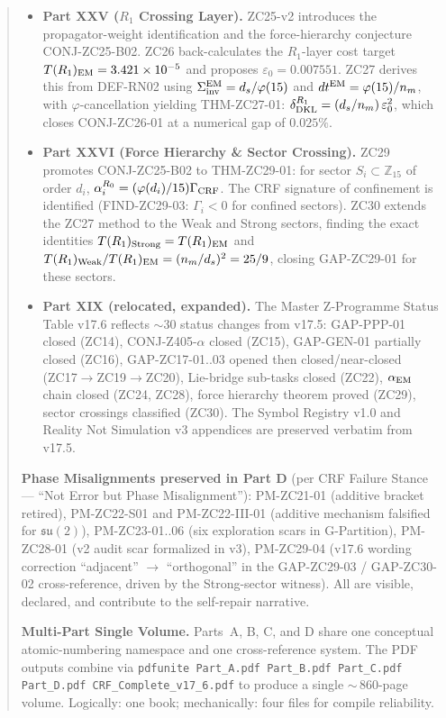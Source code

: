 \documentclass[12pt, a4paper]{article}
\begin{document}
\begin{abstract}
\begin{itemize}[leftmargin=2em]
\item \textbf{Part XXV ($R_1$ Crossing Layer).} ZC25-v2 introduces
the propagator-weight identification and the force-hierarchy
conjecture CONJ-ZC25-B02. ZC26 back-calculates the $R_1$-layer cost
target $T(R_1)_{\rm EM} = 3.421\times 10^{-5}$ and proposes
$\varepsilon_0 = 0.007551$. ZC27 derives this from DEF-RN02 using
$\Sigma_{\rm inv}^{\rm EM} = d_s/\varphi(15)$ and $dt^{\rm EM}
= \varphi(15)/n_m$, with $\varphi$-cancellation yielding
THM-ZC27-01: $\delta_{\rm DKL}^{R_1} = (d_s/n_m)\,\varepsilon_0^2$,
which closes CONJ-ZC26-01 at a numerical gap of $0.025\%$.

\item \textbf{Part XXVI (Force Hierarchy \& Sector Crossing).}
ZC29 promotes CONJ-ZC25-B02 to THM-ZC29-01: for sector $S_i \subset
\mathbb{Z}_{15}$ of order $d_i$, $\alpha_i^{R_0} = (\varphi(d_i)/15)
\Gamma_{\rm CRF}$. The CRF signature of confinement is identified
(FIND-ZC29-03: $\Gamma_i < 0$ for confined sectors). ZC30 extends
the ZC27 method to the Weak and Strong sectors, finding the exact
identities $T(R_1)_{\rm Strong} = T(R_1)_{\rm EM}$ and
$T(R_1)_{\rm Weak}/T(R_1)_{\rm EM} = (n_m/d_s)^2 = 25/9$, closing
GAP-ZC29-01 for these sectors.

\item \textbf{Part XIX (relocated, expanded).} The Master
Z-Programme Status Table v17.6 reflects $\sim$30 status changes
from v17.5: GAP-PPP-01 closed (ZC14), CONJ-Z405-$\alpha$ closed
(ZC15), GAP-GEN-01 partially closed (ZC16), GAP-ZC17-01..03
opened then closed/near-closed (ZC17$\to$ZC19$\to$ZC20), Lie-bridge
sub-tasks closed (ZC22), $\alpha_{\rm EM}$ chain closed
(ZC24, ZC28), force hierarchy theorem proved (ZC29), sector
crossings classified (ZC30). The Symbol Registry v1.0 and Reality
Not Simulation v3 appendices are preserved verbatim from v17.5.
\end{itemize}

\textbf{Phase Misalignments preserved in Part D} (per CRF Failure
Stance --- ``Not Error but Phase Misalignment''): PM-ZC21-01
(additive bracket retired), PM-ZC22-S01 and PM-ZC22-III-01 (additive
mechanism falsified for $\mathfrak{su}(2)$), PM-ZC23-01..06 (six
exploration scars in G-Partition), PM-ZC28-01 (v2 audit scar
formalized in v3), PM-ZC29-04 (v17.6 wording correction
``adjacent'' $\to$ ``orthogonal'' in the GAP-ZC29-03 /
GAP-ZC30-02 cross-reference, driven by the Strong-sector
witness). All are visible, declared, and contribute to the
self-repair narrative.

\textbf{Multi-Part Single Volume.} Parts~A, B, C, and D share one
conceptual atomic-numbering namespace and one cross-reference system.
The PDF outputs combine via \texttt{pdfunite Part\_A.pdf Part\_B.pdf
Part\_C.pdf Part\_D.pdf CRF\_Complete\_v17\_6.pdf} to produce a
single $\sim$\,860-page volume. Logically: one book; mechanically:
four files for compile reliability.


\end{abstract}
\end{document}
